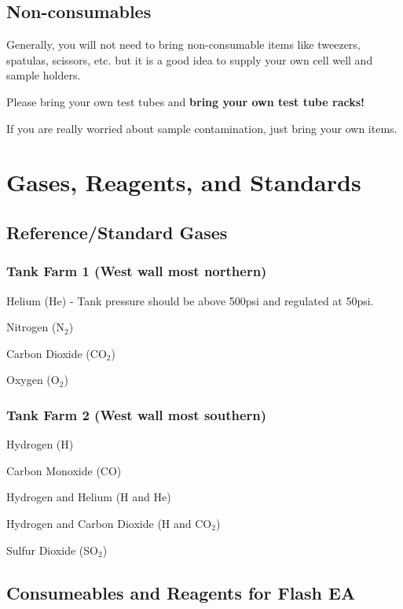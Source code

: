 \documentclass[12pt]{../SOP3}\usepackage[]{graphicx}\usepackage[]{color}
\begin{document}
\subsection{Non-consumables}

\NP Generally, you will not need to bring non-consumable items like tweezers, spatulas, scissors, etc. but it is a good idea to supply your own cell well and sample holders.

\NP Please bring your own test tubes and \textbf{bring your own test tube racks!}

\NP If you are really worried about sample contamination, just bring your own items.

\section{Gases, Reagents, and Standards}

\subsection{Reference/Standard Gases}

\subsubsection{Tank Farm 1 (West wall most northern)}

\NP Helium (He) - Tank pressure should be above 500psi and regulated at 50psi.

\NP Nitrogen (N$_2$)

\NP Carbon Dioxide (CO$_2$)

\NP Oxygen (O$_2$)

\subsubsection{Tank Farm 2 (West wall most southern)}

\NP Hydrogen (H)

\NP Carbon Monoxide (CO)

\NP Hydrogen and Helium (H and He)

\NP Hydrogen and Carbon Dioxide (H and CO$_2$)

\NP Sulfur Dioxide (SO$_2$)

\subsection{Consumeables and Reagents for Flash EA} \label{subsec:Consumables and Reagents for Flash EA}
\end{document}
